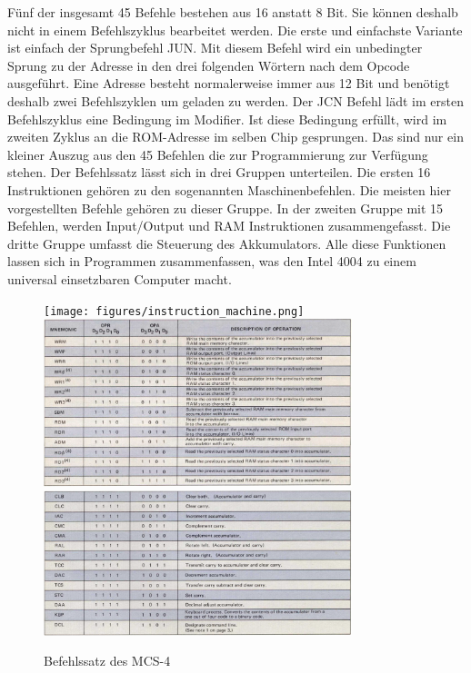 Fünf der insgesamt 45 Befehle bestehen aus 16 anstatt 8 Bit. Sie können deshalb nicht in einem Befehlszyklus bearbeitet werden. Die erste und einfachste Variante ist einfach der Sprungbefehl JUN. Mit diesem Befehl wird ein unbedingter Sprung zu der Adresse in den drei folgenden Wörtern nach dem Opcode ausgeführt. Eine Adresse besteht normalerweise immer aus 12 Bit und benötigt deshalb zwei Befehlszyklen um geladen zu werden. Der JCN Befehl lädt im ersten Befehlszyklus eine Bedingung im Modifier. Ist diese Bedingung erfüllt, wird im zweiten Zyklus an die ROM-Adresse im selben Chip gesprungen. Das sind nur ein kleiner Auszug aus den 45 Befehlen die zur Programmierung zur Verfügung stehen. Der Befehlssatz lässt sich in drei Gruppen unterteilen. Die ersten 16 Instruktionen gehören zu den sogenannten Maschinenbefehlen. Die meisten hier vorgestellten Befehle gehören zu dieser Gruppe. In der zweiten Gruppe mit 15 Befehlen, werden Input/Output und RAM Instruktionen zusammengefasst. Die dritte Gruppe umfasst die Steuerung des Akkumulators. Alle diese Funktionen lassen sich in Programmen zusammenfassen, was den Intel 4004 zu einem universal einsetzbaren Computer macht.

 \begin{figure}[ht]
 	\centering
 	\texttt{[image: figures/instruction\_machine.png]}
 	 \includegraphics[width=0.8\textwidth]{figures/instruction_ram.png} 	\includegraphics[width=0.8\textwidth]{figures/instruction_accum.png}
 	\caption{Befehlssatz des MCS-4}
 	\label{fig:cycle}
 \end{figure}